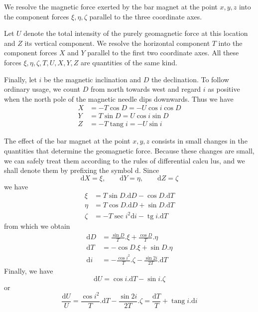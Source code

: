 We resolve the magnetic force exerted by the bar magnet at the point $x,y,z$ into the component forces $\xi,\eta,\zeta$ parallel to the three coordinate axes.

Let $U$ denote the total intensity of the purely geomagnetic force at this location and $Z$ its vertical component. We resolve the horizontal component $T$ into the component forces $X$ and $Y$ parallel to the first two coordinate axes. All these forces $\xi,\eta,\zeta,T,U,X,Y,Z$ are quantities of the same kind.

Finally, let $i$ be the magnetic inclination and $D$ the declination. To follow ordinary usage, we count $D$ from north towards west and regard $i$ as positive when the north pole of the magnetic needle dips downwards. Thus we have
\[
\begin{aligned}
X&=-T\cos D=-U\cos i\cos D\\
Y&=T\sin D=U\cos i\sin D\\
Z&=-T\operatorname{tang}i=-U\sin i
\end{aligned}
\]

The effect of the bar magnet at the point $x,y,z$ consists in small changes in the quantities that determine the geomagnetic force. Because these changes are small, we can safely treat them according to the rules of differential calcu%
lus, and we shall denote them by prefixing the symbol $\mathrm{d}$. Since
\[
\mathrm{d}X=\xi,\qquad\mathrm{d}Y=\eta,\qquad\mathrm{d}Z=\zeta
\]
we have
\[
\begin{aligned}
\xi&=T\sin D.\mathrm{d}D-\cos D.\mathrm{d}T\\
\eta&=T\cos D.\mathrm{d}D+\sin D.\mathrm{d}T\\
\zeta&=-T\sec i^2\mathrm{d}i-\operatorname{tg}i.\mathrm{d}T
\end{aligned}
\]
from which we obtain
\[
\begin{aligned}
\mathrm{d}D&=\frac{\sin D}{T}.\xi+\frac{\cos D}{T}.\eta\\
\mathrm{d}T&=-\cos D.\xi+\sin D.\eta\\
\mathrm{d}i&=-\frac{\cos i^2}{T}.\zeta-\frac{\sin2i}{2T}.\mathrm{d}T
\end{aligned}
\]
Finally, we have
\[
\mathrm{d}U=\cos i.\mathrm{d}T-\sin i.\zeta
\]
or
\[
\frac{\mathrm{d}U}{U}=\frac{\cos i^2}{T}.\mathrm{d}T-\frac{\sin2i}{2T}.\zeta=\frac{\mathrm{d}T}{T}+\operatorname{tang}i.\mathrm{d}i
\]

